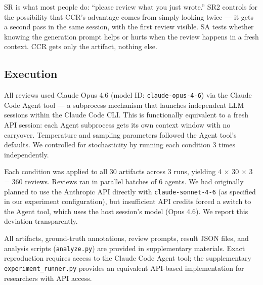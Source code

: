 \documentclass[11pt]{article}
\begin{document}
\begin{table}[h]
\centering
\small
{}
\caption{Review conditions and their available context.}
\label{tab:conditions}
\end{table}

SR is what most people do: ``please review what you just wrote.'' SR2 controls for the possibility that CCR's advantage comes from simply looking twice --- it gets a second pass in the same session, with the first review visible. SA tests whether knowing the generation prompt helps or hurts when the review happens in a fresh context. CCR gets only the artifact, nothing else.

\subsection{Execution}

All reviews used Claude Opus 4.6 (model ID: \texttt{claude-opus-4-6}) via the Claude Code Agent tool --- a subprocess mechanism that launches independent LLM sessions within the Claude Code CLI. This is functionally equivalent to a fresh API session: each Agent subprocess gets its own context window with no carryover. Temperature and sampling parameters followed the Agent tool's defaults. We controlled for stochasticity by running each condition 3 times independently.

Each condition was applied to all 30 artifacts across 3 runs, yielding 4 $\times$ 30 $\times$ 3 = 360 reviews. Reviews ran in parallel batches of 6 agents. We had originally planned to use the Anthropic API directly with \texttt{claude-sonnet-4-6} (as specified in our experiment configuration), but insufficient API credits forced a switch to the Agent tool, which uses the host session's model (Opus 4.6). We report this deviation transparently.

All artifacts, ground-truth annotations, review prompts, result JSON files, and analysis scripts (\texttt{analyze.py}) are provided in supplementary materials. Exact reproduction requires access to the Claude Code Agent tool; the supplementary \texttt{experiment\_runner.py} provides an equivalent API-based implementation for researchers with API access.
\end{document}
